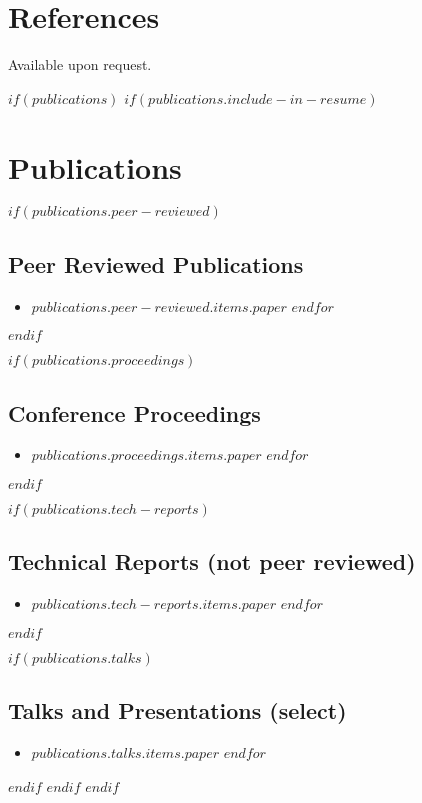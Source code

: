 \documentclass[letterpaper,10pt,final]{moderncv}
\begin{document}
\section{References}
Available upon request.

$if(publications)$
$if(publications.include-in-resume)$
\section{Publications}
$if(publications.peer-reviewed)$
\subsection{Peer Reviewed Publications}
\begin{itemize}
$for(publications.peer-reviewed.items)$
\item $publications.peer-reviewed.items.paper$
$endfor$
\end{itemize}
$endif$

$if(publications.proceedings)$
\subsection{Conference Proceedings}
\begin{itemize}
$for(publications.proceedings.items)$
\item $publications.proceedings.items.paper$
$endfor$
\end{itemize}
$endif$

$if(publications.tech-reports)$
\subsection{Technical Reports (not peer reviewed)}
\begin{itemize}
$for(publications.tech-reports.items)$
\item $publications.tech-reports.items.paper$
$endfor$
\end{itemize}
$endif$

$if(publications.talks)$
\subsection{Talks and Presentations (select)}
\begin{itemize}
$for(publications.talks.items)$
\item $publications.talks.items.paper$
$endfor$
\end{itemize}
$endif$
$endif$
$endif$

\end{document}
